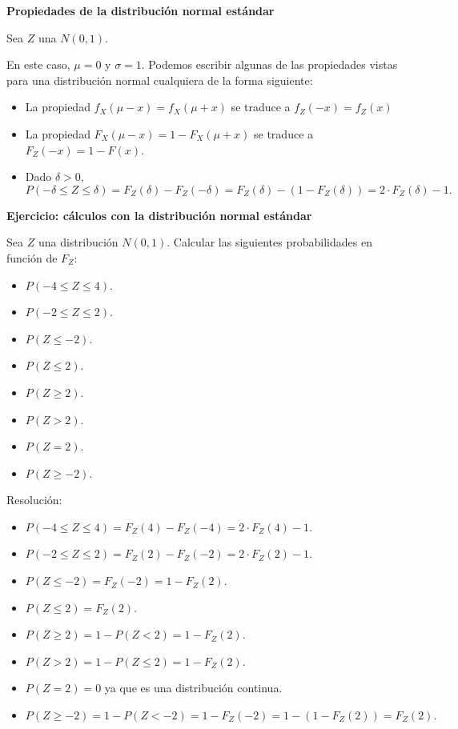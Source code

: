 \documentclass[]{book}
\providecommand{\tightlist}{%
  \setlength{\itemsep}{0pt}\setlength{\parskip}{0pt}}
\begin{document}
\textbf{Propiedades de la distribución normal estándar}

Sea \(Z\) una \(N(0,1)\).

En este caso, \(\mu=0\) y \(\sigma=1\). Podemos escribir algunas de las propiedades vistas para una distribución normal cualquiera de la forma siguiente:

\begin{itemize}
\tightlist
\item
  La propiedad \(f_X(\mu-x)=f_X(\mu+x)\) se traduce a \(f_Z(-x)=f_Z(x)\)
\item
  La propiedad \(F_X(\mu-x)=1-F_X(\mu+x)\) se traduce a \(F_Z(-x)=1-F(x).\)
\item
  Dado \(\delta>0\),
  \[
  P(-\delta\leq Z \leq \delta)=F_{Z}(\delta)-F_{Z}(-\delta)=F_Z(\delta)-(1-F_Z(\delta))=
  2\cdot F_Z(\delta)-1.
  \]
\end{itemize}

\textbf{Ejercicio: cálculos con la distribución normal estándar}

Sea \(Z\) una distribución \(N(0,1)\). Calcular las siguientes probabilidades en función de \(F_Z\):

\begin{itemize}
\tightlist
\item
  \(P(-4\leq Z \leq 4).\)
\item
  \(P(-2\leq Z \leq 2).\)
\item
  \(P(Z\leq -2).\)
\item
  \(P( Z \leq 2).\)
\item
  \(P( Z \geq 2).\)
\item
  \(P( Z > 2).\)
\item
  \(P( Z = 2).\)
\item
  \(P( Z \geq -2).\)
\end{itemize}

Resolución:

\begin{itemize}
\tightlist
\item
  \(P(-4\leq Z \leq 4)=F_{Z}(4)-F_{Z}(-4)=2\cdot F_Z(4)-1\).
\item
  \(P(-2\leq Z \leq 2)=F_{Z}(2)-F_{Z}(-2)=2\cdot F_Z(2)-1\).
\item
  \(P(Z\leq -2)=F_Z(-2)=1-F_Z(2)\).
\item
  \(P( Z \leq 2)=F_{Z}(2)\).
\item
  \(P( Z \geq 2)=1-P(Z<2)=1-F_{Z}(2)\).
\item
  \(P( Z > 2)=1-P(Z\leq 2)=1-F_{Z}(2)\).
\item
  \(P( Z = 2)=0\) ya que es una distribución continua.
\item
  \(P( Z \geq -2)=1-P(Z< -2)=1-F_{Z}(-2)=1-(1-F_Z(2))=F_Z(2).\)
\end{itemize}
\end{document}

